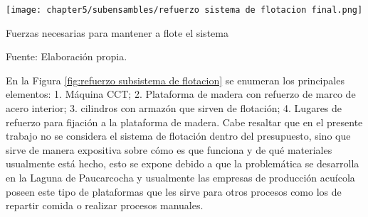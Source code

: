 \begin{myfigure}[H]
	\footnotesize\centering
	\texttt{[image: chapter5/subensambles/refuerzo sistema de flotacion final.png]}
	\caption{Fuerzas necesarias para mantener a flote el sistema}
	\begin{myflushcenter}
		Fuente: Elaboración propia.
	\end{myflushcenter}
	\label{fig:refuerzo subsistema de flotacion}
\end{myfigure}

En la Figura \ref{fig:refuerzo subsistema de flotacion} se enumeran los principales elementos: 1. Máquina CCT; 2. Plataforma de madera con refuerzo de marco de acero interior; 3. cilindros con armazón que sirven de flotación; 4. Lugares de refuerzo para fijación a la plataforma de madera. Cabe resaltar que en el presente trabajo no se considera el sistema de flotación dentro del presupuesto, sino que sirve de manera expositiva sobre cómo es que funciona y de qué materiales usualmente está hecho, esto se expone debido a que la problemática se desarrolla en la Laguna de Paucarcocha y usualmente las empresas de producción acuícola poseen este tipo de plataformas que les sirve para otros procesos como los de repartir comida o realizar procesos manuales.


